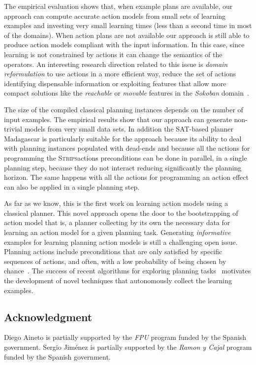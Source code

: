 \documentclass[letterpaper]{article} %
\newcommand{\strips}{\textsc{Strips}}     %
\begin{document}
The empirical evaluation shows that, when example plans are available, our approach can compute accurate action models from small sets of learning examples and investing very small learning times (less than a second time in most of the domains). When action plans are not available our approach is still able to produce action models compliant with the input information. In this case, since learning is not constrained by actions it can change the semantics of the operators. An interesting research direction related to this issue is {\em domain reformulation} to use actions in a more efficient way, reduce the set of actions identifying dispensable information or exploiting features that allow more compact solutions like the {\em reachable} or {\em movable} features in the {\em Sokoban} domain~\cite{haslum:axiomsoptimal:ijcai15}.

The size of the compiled classical planning instances depends on the number of input examples. The empirical results show that our approach can generate non-trivial models from very small data sets. In addition the SAT-based planner {\sc Madagascar} is particularly suitable for the approach because its ability to deal with planning instances populated with dead-ends and because all the actions for programming the \strips actions preconditions can be done in parallel, in a single planning step, because they do not interact reducing significantly the planning horizon. The same happens with all the actions for programming an action effect can also be applied in a single planning step.

As far as we know, this is the first work on learning action models using a classical planner. This novel approach opens the door to the bootstrapping of action model that is, a planner collecting by its own the necessary data for learning an action model for a given planning task. Generating {\em informative} examples for learning planning action models is still a challenging open issue. Planning actions include preconditions that are only satisfied by specific sequences of actions, and often, with a low probability of being chosen by chance~\cite{fern2004learning}. The success of recent algorithms for exploring planning tasks~\cite{geffner:novelty:IJCAI17} motivates the development of novel techniques that autonomously collect the learning examples.

\begin{small}
\subsection*{Acknowledgment}
Diego Aineto is partially supported by the {\it FPU} program funded by the Spanish government. Sergio Jim\'enez is partially supported by the {\it Ramon y Cajal} program funded by the Spanish government.
\end{small}





\end{document}
